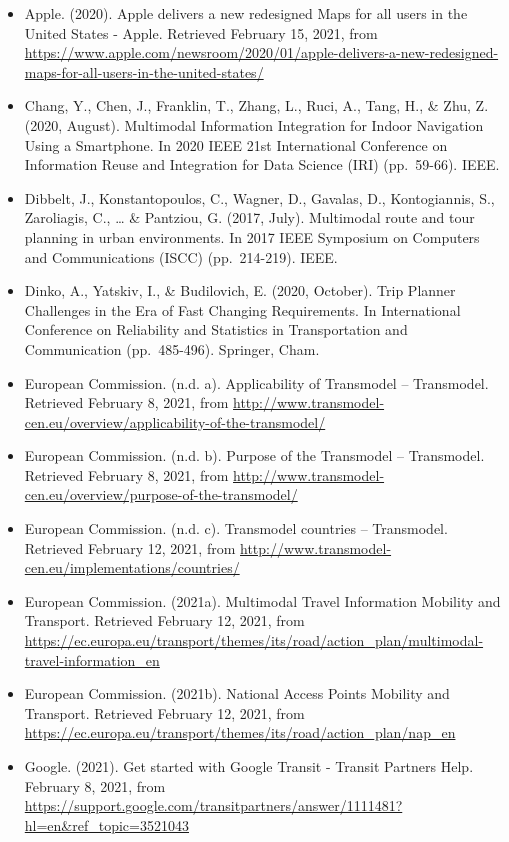 \documentclass[
]{book}
\providecommand{\tightlist}{%
  \setlength{\itemsep}{0pt}\setlength{\parskip}{0pt}}
\begin{document}
\begin{itemize}
\tightlist
\item
  Apple. (2020). Apple delivers a new redesigned Maps for all users in the United States - Apple. Retrieved February 15, 2021, from \url{https://www.apple.com/newsroom/2020/01/apple-delivers-a-new-redesigned-maps-for-all-users-in-the-united-states/}
\item
  Chang, Y., Chen, J., Franklin, T., Zhang, L., Ruci, A., Tang, H., \& Zhu, Z. (2020, August). Multimodal Information Integration for Indoor Navigation Using a Smartphone. In 2020 IEEE 21st International Conference on Information Reuse and Integration for Data Science (IRI) (pp.~59-66). IEEE.
\item
  Dibbelt, J., Konstantopoulos, C., Wagner, D., Gavalas, D., Kontogiannis, S., Zaroliagis, C., \ldots{} \& Pantziou, G. (2017, July). Multimodal route and tour planning in urban environments. In 2017 IEEE Symposium on Computers and Communications (ISCC) (pp.~214-219). IEEE.
\item
  Dinko, A., Yatskiv, I., \& Budilovich, E. (2020, October). Trip Planner Challenges in the Era of Fast Changing Requirements. In International Conference on Reliability and Statistics in Transportation and Communication (pp.~485-496). Springer, Cham.
\item
  European Commission. (n.d. a). Applicability of Transmodel -- Transmodel. Retrieved February 8, 2021, from \url{http://www.transmodel-cen.eu/overview/applicability-of-the-transmodel/}
\item
  European Commission. (n.d. b). Purpose of the Transmodel -- Transmodel. Retrieved February 8, 2021, from \url{http://www.transmodel-cen.eu/overview/purpose-of-the-transmodel/}
\item
  European Commission. (n.d. c). Transmodel countries -- Transmodel. Retrieved February 12, 2021, from \url{http://www.transmodel-cen.eu/implementations/countries/}
\item
  European Commission. (2021a). Multimodal Travel Information \textbar{} Mobility and Transport. Retrieved February 12, 2021, from \url{https://ec.europa.eu/transport/themes/its/road/action_plan/multimodal-travel-information_en}
\item
  European Commission. (2021b). National Access Points \textbar{} Mobility and Transport. Retrieved February 12, 2021, from \url{https://ec.europa.eu/transport/themes/its/road/action_plan/nap_en}
\item
  Google. (2021). Get started with Google Transit - Transit Partners Help. February 8, 2021, from \url{https://support.google.com/transitpartners/answer/1111481?hl=en\&ref_topic=3521043}

\end{itemize}
\end{document}
